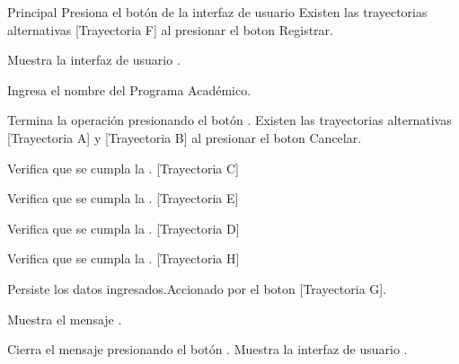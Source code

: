 \begin{UCtrayectoria}{Principal}
    \UCpaso[\UCactor] Presiona el botón de la interfaz de usuario Existen las trayectorias alternativas [Trayectoria F] al presionar el boton Registrar.   

    \UCpaso Muestra la interfaz de usuario .

    \UCpaso[\UCactor] Ingresa el nombre del Programa Académico.

    \UCpaso[\UCactor] Termina la operación presionando el botón . Existen las trayectorias alternativas [Trayectoria A] y [Trayectoria B] al presionar el boton Cancelar.

    \UCpaso Verifica que se cumpla la . [Trayectoria C]

    \UCpaso Verifica que se cumpla la . [Trayectoria E]

    \UCpaso Verifica que se cumpla la . [Trayectoria D]    

    \UCpaso Verifica que se cumpla la . [Trayectoria H]    

    \UCpaso Persiste los datos ingresados.Accionado por el boton  [Trayectoria G].

    \UCpaso Muestra el mensaje .

    \UCpaso[\UCactor] Cierra el mensaje presionando el botón .
    \UCpaso Muestra la interfaz de usuario .
\end{UCtrayectoria}


